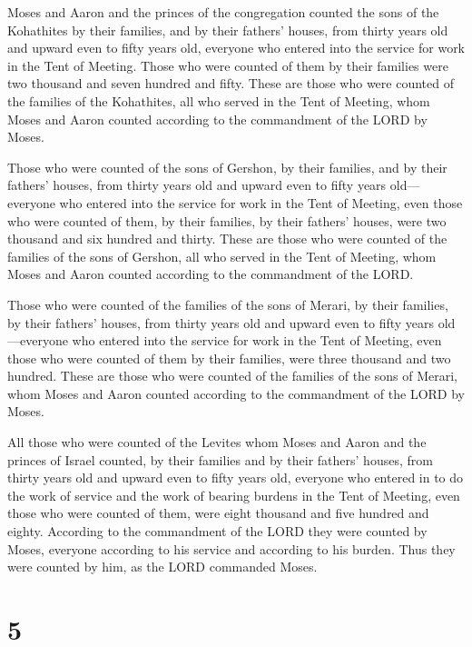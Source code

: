  Moses and Aaron and the princes of the congregation
counted the sons of the Kohathites by their families, and by their
fathers' houses,  from thirty years old and upward even to
fifty years old, everyone who entered into the service for work in the
Tent of Meeting.  Those who were counted of them by their
families were two thousand and seven hundred and fifty. 
These are those who were counted of the families of the Kohathites, all
who served in the Tent of Meeting, whom Moses and Aaron counted
according to the commandment of the LORD by Moses.

 Those who were counted of the sons of Gershon, by their
families, and by their fathers' houses,  from thirty years
old and upward even to fifty years old---everyone who entered into the
service for work in the Tent of Meeting,  even those who
were counted of them, by their families, by their fathers' houses, were
two thousand and six hundred and thirty.  These are those
who were counted of the families of the sons of Gershon, all who served
in the Tent of Meeting, whom Moses and Aaron counted according to the
commandment of the LORD.

 Those who were counted of the families of the sons of
Merari, by their families, by their fathers' houses,  from
thirty years old and upward even to fifty years old---everyone who
entered into the service for work in the Tent of Meeting, 
even those who were counted of them by their families, were three
thousand and two hundred.  These are those who were counted
of the families of the sons of Merari, whom Moses and Aaron counted
according to the commandment of the LORD by Moses.

 All those who were counted of the Levites whom Moses and
Aaron and the princes of Israel counted, by their families and by their
fathers' houses,  from thirty years old and upward even to
fifty years old, everyone who entered in to do the work of service and
the work of bearing burdens in the Tent of Meeting,  even
those who were counted of them, were eight thousand and five hundred and
eighty.  According to the commandment of the LORD they were
counted by Moses, everyone according to his service and according to his
burden. Thus they were counted by him, as the LORD commanded Moses.

\hypertarget{section-4}{%
\section{5}\label{section-4}}

